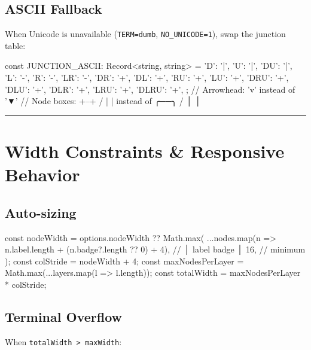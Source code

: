 \subsection{ASCII Fallback}\label{record-426-ascii-fallback}

When Unicode is unavailable (\texttt{T\allowbreak{}E\allowbreak{}R\allowbreak{}M\allowbreak{}=\allowbreak{}d\allowbreak{}u\allowbreak{}m\allowbreak{}b}, \texttt{N\allowbreak{}O\allowbreak{}\_\allowbreak{}U\allowbreak{}N\allowbreak{}I\allowbreak{}C\allowbreak{}O\allowbreak{}D\allowbreak{}E\allowbreak{}=\allowbreak{}1}), swap the junction table:

\begin{CodeBlock}
const JUNCTION_ASCII: Record<string, string> = {
  'D': '|', 'U': '|', 'DU': '|',
  'L': '-', 'R': '-', 'LR': '-',
  'DR': '+', 'DL': '+', 'RU': '+', 'LU': '+',
  'DRU': '+', 'DLU': '+', 'DLR': '+', 'LRU': '+', 'DLRU': '+',
};
// Arrowhead: 'v' instead of '▼'
// Node boxes: +--+ / |  | instead of ╭──╮ / │  │
\end{CodeBlock}

\begin{center}\rule{0.5\linewidth}{0.5pt}\end{center}

\section{Width Constraints \& Responsive Behavior}\label{record-426-width-constraints-responsive-behavior}

\subsection{Auto-sizing}\label{record-426-auto-sizing}

\begin{CodeBlock}
const nodeWidth = options.nodeWidth ?? Math.max(
  ...nodes.map(n => n.label.length + (n.badge?.length ?? 0) + 4),  // │ label badge │
  16,  // minimum
);
const colStride = nodeWidth + 4;
const maxNodesPerLayer = Math.max(...layers.map(l => l.length));
const totalWidth = maxNodesPerLayer * colStride;
\end{CodeBlock}

\subsection{Terminal Overflow}\label{record-426-terminal-overflow}

When \texttt{t\allowbreak{}o\allowbreak{}t\allowbreak{}a\allowbreak{}l\allowbreak{}W\allowbreak{}i\allowbreak{}d\allowbreak{}t\allowbreak{}h\allowbreak{} \allowbreak{}>\allowbreak{} \allowbreak{}m\allowbreak{}a\allowbreak{}x\allowbreak{}W\allowbreak{}i\allowbreak{}d\allowbreak{}t\allowbreak{}h}:

